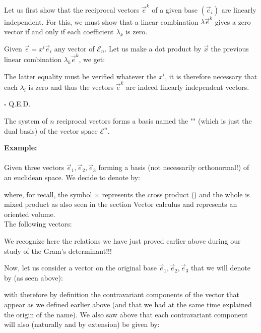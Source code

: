 	Let us first show that the reciprocal vectors $\vec{e}^k$ of a given base $(\vec{e}_i)$ are linearly independent. For this, we must show that a linear combination $\lambda\vec{e}^k$ gives a zero vector if and only if each coefficient $\lambda_k$ is zero.
	\begin{dem}
	Given $\vec{e}=x^i\vec{e}_i$ any vector of $\mathcal{E}_n$. Let us make a dot product by $\vec{x}$ the previous linear combination $\lambda_k \vec{e}^k$, we get:
	
	The latter equality must be verified whatever the $x^i$, it is therefore necessary that each $\lambda_i$ is zero and thus the vectors $\vec{e}^k$ are indeed linearly independent vectors.
	\begin{flushright}
		$\square$  Q.E.D.
	\end{flushright}
	\end{dem} 
	The system of $n$ reciprocal vectors forms a basis named the "" (which is just the dual basis) of the vector space $\mathcal{E}^n$.
	\begin{tcolorbox}[colframe=black,colback=white,sharp corners]
	\textbf{{\Large {}}Example:}\\\\
	Given three vectors $\vec{e}_1,\vec{e}_2,\vec{e}_3$ forming a basis (not necessarily orthonormal!) of an euclidean space. We decide to denote by:
	
	where, for recall, the symbol $\times$ represents the cross product () and the whole is mixed product as also seen in the section Vector calculus and represents an oriented volume.\\
	
	The following vectors:
	
	\begin{tcolorbox}[title=Remark,colframe=black,arc=10pt]
	We recognize here the relations we have just proved earlier above during our study of the Gram's determinant!!!
	\end{tcolorbox}
	\end{tcolorbox}
	Now, let us consider a vector on the original base $\vec{e}_1,\vec{e}_2,\vec{e}_3$ that we will denote by (as seen above):
	
	with therefore by definition the contravariant components of the vector that appear as we defined earlier above (and that we had at the same time explained the origin of the name). We also saw above that each contravariant component will also (naturally and by extension) be given by:
	
